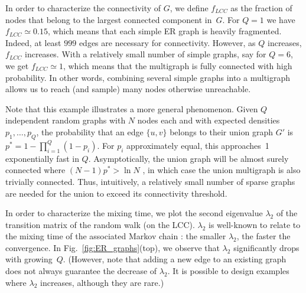 \documentclass[10pt, conference]{./IEEEtran}
\newcommand{\fig}[1]{Fig.~\ref{#1}}
\newcommand{\eq}{\!\!=\!\!}
\begin{document}
In order to characterize the connectivity of $G$, we define $f_{LCC}$ as the fraction of nodes that belong to the largest connected component in~$G$. For $Q\eq 1$ we have $f_{LCC}\simeq 0.15$, which means that each simple ER graph is heavily fragmented. Indeed, at least $999$ edges are necessary for connectivity. However, as $Q$ increases, $f_{LCC}$ increases.
%
With a relatively small number of simple graphs, say for $Q=6$, we get $f_{LCC}\simeq1$, which means that the multigraph is fully connected with high probability. In other words, combining several simple graphs into a multigraph allows us to reach (and sample) many nodes otherwise unreachable.
%




Note that this example illustrates a more general phenomenon.  Given $Q$ independent random graphs with $N$ nodes each and with expected densities $p_1,\ldots,p_Q$, the probability that an edge $\{u,v\}$ belongs to their union graph $G'$ is $p^*=1-\prod_{i=1}^Q(1-p_i)$.  For $p_i$ approximately equal, this approaches~1 exponentially fast in $Q$.  Asymptotically, the union graph will be almost surely connected where $(N-1) p^*> \ln N$ \cite[pp413--417]{West96}, in which case the union multigraph is also trivially connected.  Thus, intuitively, a relatively small number of sparse graphs are needed for the union to exceed its connectivity threshold.
%
%
%
%
%
%
%
%
%



In order to characterize the mixing time, we plot the second eigenvalue  $\lambda_2$ of the transition matrix of the random walk (on the LCC).  $\lambda_2$ is well-known to relate to the mixing time of the associated Markov chain \cite{Boyd2004_mixing}: the smaller $\lambda_2$, the faster the convergence. In \fig{fig:ER_graphs}(top), we observe that $\lambda_2$ significantly drops with growing~$Q$.
(However, note that adding a new edge to an existing graph does not always guarantee the decrease of $\lambda_2$. It is possible to design examples where $\lambda_2$  increases, although they are rare.)
\end{document}
